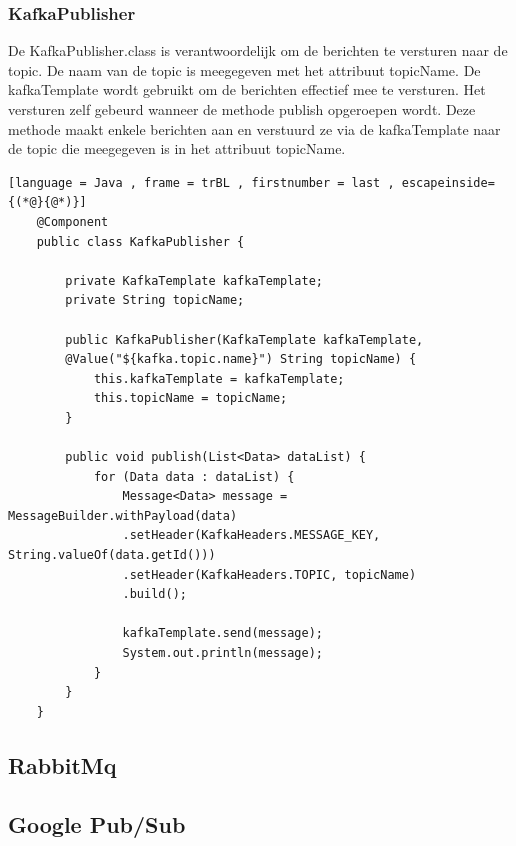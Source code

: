     \subsubsection{KafkaPublisher}
    De KafkaPublisher.class is verantwoordelijk om de berichten te versturen naar de topic. De naam van de topic is meegegeven met het attribuut topicName. De kafkaTemplate wordt gebruikt om de berichten effectief mee te versturen. Het versturen zelf gebeurd wanneer de methode publish opgeroepen wordt. Deze methode maakt enkele berichten aan en verstuurd ze via de kafkaTemplate naar de topic die meegegeven is in het attribuut topicName.
        \begin{lstlisting}[language = Java , frame = trBL , firstnumber = last , escapeinside={(*@}{@*)}]
    @Component
    public class KafkaPublisher {
        
        private KafkaTemplate kafkaTemplate;
        private String topicName;
        
        public KafkaPublisher(KafkaTemplate kafkaTemplate,
        @Value("${kafka.topic.name}") String topicName) {
            this.kafkaTemplate = kafkaTemplate;
            this.topicName = topicName;
        }
        
        public void publish(List<Data> dataList) {
            for (Data data : dataList) {
                Message<Data> message = MessageBuilder.withPayload(data)
                .setHeader(KafkaHeaders.MESSAGE_KEY, String.valueOf(data.getId()))
                .setHeader(KafkaHeaders.TOPIC, topicName)
                .build();
                
                kafkaTemplate.send(message);
                System.out.println(message);
            }
        }
    }
     \end{lstlisting}
\subsection{RabbitMq}

\subsection{Google Pub/Sub}

